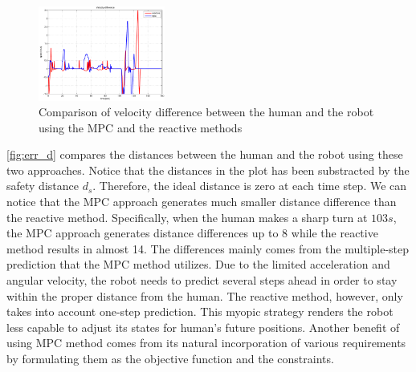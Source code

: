 \documentclass[letterpaper, 10 pt, conference]{ieeeconf}
\begin{document}
\begin{figure}
\centering
\includegraphics[width=0.37\textwidth]{figures/mpc_vs_reac_vel_diff.pdf}
\caption{Comparison of velocity difference between the human and the robot using the MPC and the reactive methods}
\label{fig:err_v}
\end{figure}
\cref{fig:err_d} compares the distances between the human and the robot using these two approaches.
Notice that the distances in the plot has been substracted by the safety distance $d_s$.
Therefore, the ideal distance is zero at each time step.
We can notice that the MPC approach generates much smaller distance difference than the reactive method.
Specifically, when the human makes a sharp turn at $103 s$, the MPC approach generates distance differences up to 8 while the reactive method results in almost 14.
The differences mainly comes from the multiple-step prediction that the MPC method utilizes.
Due to the limited acceleration and angular velocity, the robot needs to predict several steps ahead in order to stay within the proper distance from the human.
The reactive method, however, only takes into account one-step prediction.
This myopic strategy renders the robot less capable to adjust its states for human's future positions.
Another benefit of using MPC method comes from its natural incorporation of various requirements by formulating them as the objective function and the constraints.
\end{document}
